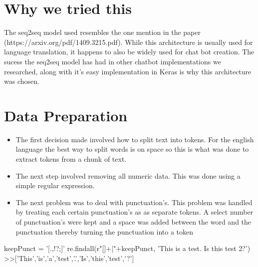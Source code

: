 \documentclass[12pt]{article}
\begin{document}
\section*{Why we tried this}
The seq2seq model used resembles the one mention in the paper (https://arxiv.org/pdf/1409.3215.pdf). While this architecture is usually used for language translation, it happens to also be widely used for chat bot creation. The sucess the seq2seq model has had in other chatbot implementations we researched, along with it's easy implementation in Keras is why this architecture was chosen.

\section*{Data Preparation}
\begin{itemize}
  \item The first decision made involved how to split text into tokens. For the english language the best way to split words is on space so this is what was done to extract tokens from a chunk of text.
  \item The next step involved removing all numeric data. This was done using a simple regular expression.
  \item The next problem was to deal with punctuation's. This problem was handled by treating each certain punctuation's as as separate tokens. A select number of punctuation's were kept and a space was added between the word and the punctuation thereby turning the punctuation into a token
\end{itemize}
\begin{python}
    keepPunct = '[.,!?;]'
    re.findall(r"[\w]+|"+keepPunct, 
            'This is a test. Is this test 2?')
    >>['This','is','a','test','.','Is','this','test','?']
\end{python}
\end{document}
